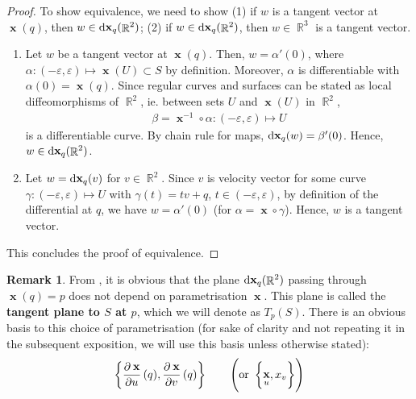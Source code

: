 \documentclass{amsart} %
\renewcommand{\epsilon}{\varepsilon}
\theoremstyle{mytheoremstyle}
\theoremstyle{definition}
\newtheorem{remark}[definition]{Remark}
\numberwithin{equation}{section}
\DeclareMathOperator{\R}{\mathbb{R}}
\DeclareMathOperator{\1}{\mathbbm{1}}
\DeclareMathOperator{\D}{\dif}
\DeclareMathOperator{\x}{\mathbf{x}}
\renewcommand{\epsilon}{\varepsilon}
\renewcommand{\epsilon}{\varepsilon}
\begin{document}
\begin{proof}
	To show equivalence, we need to show (1) if $w$ is a tangent vector at $\x(q)$, then $w \in \D \x_q (\R^2)$; (2) if $w \in \D \x_q (\R^2)$, then $w \in \R^3$ is a tangent vector.
	
	\begin{enumerate}
		\item Let $w $ be a tangent vector at $\x(q)$. Then, $w = \alpha'(0)$, where $\alpha: (-\epsilon,\epsilon) \mapsto \x(U) \subset S$ by definition. Moreover, $\alpha$ is differentiable with $\alpha(0) = \x(q)$. Since regular curves and surfaces can be stated as local diffeomorphisms of $\R^2$, ie. between sets $U $ and $\x(U)$ in $\R^2$,
		\begin{align}
		\label{eqbetachangeofcoordinatesfromRtoopensubset}
		\beta = \x^{-1} \circ \alpha : (-\epsilon,\epsilon) \mapsto U
		\end{align}
		is a differentiable curve. By chain rule for maps, $\D \x_q (w) = \beta'(0)$. Hence, $w \in \D \x_q (\R^2)$.
		
		
		\item Let $w = \D \x_q (v)$ for $v \in \R^2$. Since $v$ is velocity vector for some curve $\gamma : (-\epsilon,\epsilon) \mapsto U$ with $\gamma(t) = tv + q$, $t \in (-\epsilon,\epsilon)$, by definition of the differential at $q$, we have $w=\alpha'(0)$ (for $\alpha = \x \circ \gamma$). Hence, $w$ is a tangent vector.
	\end{enumerate}
	
	\noindent This concludes the proof of equivalence.
\end{proof}

\begin{remark}
	From , it is obvious that the plane $\D \x_q (\R^2)$ passing through $\x(q) = p$ does not depend on parametrisation $\x$. This plane is called the \textbf{tangent plane to $S$ at $p$}, which we will denote as $T_p (S)$. There is an obvious basis to this choice of parametrisation (for sake of clarity and not repeating it in the subsequent exposition, we will use this basis unless otherwise stated):
	\begin{align}
		\label{eqbasisfortangentplanes}
		\set{ \dpd{\x}{u}(q) , \dpd{\x}{v}(q) } \qquad \left( \text{or } \set{\x_u,x_v} \right)
	\end{align}
\end{remark}
\end{document}
